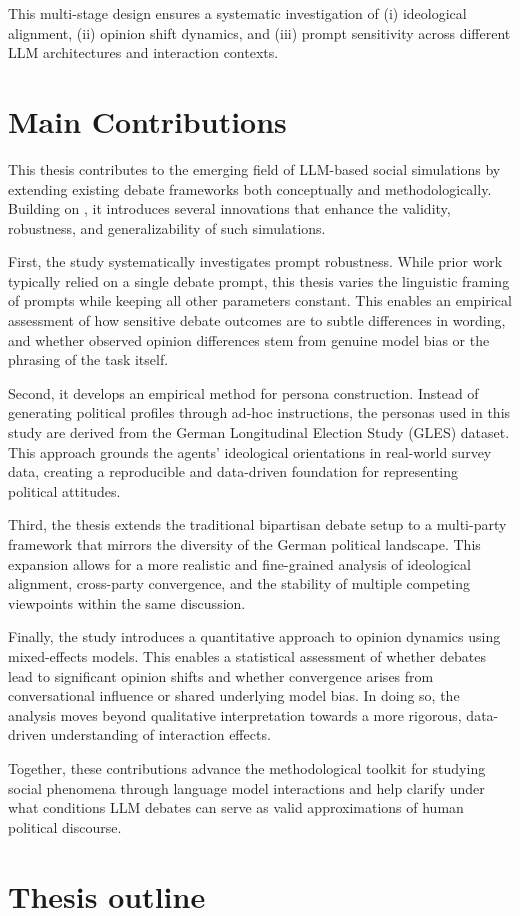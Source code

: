 This multi-stage design ensures a systematic investigation of (i) ideological alignment, (ii) opinion shift dynamics, and (iii) prompt sensitivity across different LLM architectures and interaction contexts.



\section{Main Contributions}

This thesis contributes to the emerging field of LLM-based social simulations by extending existing debate frameworks both conceptually and methodologically. Building on \citet{taubenfeld_systematic_2024}, it introduces several innovations that enhance the validity, robustness, and generalizability of such simulations.

First, the study systematically investigates prompt robustness. While prior work typically relied on a single debate prompt, this thesis varies the linguistic framing of prompts while keeping all other parameters constant. This enables an empirical assessment of how sensitive debate outcomes are to subtle differences in wording, and whether observed opinion differences stem from genuine model bias or the phrasing of the task itself.

Second, it develops an empirical method for persona construction. Instead of generating political profiles through ad-hoc instructions, the personas used in this study are derived from the German Longitudinal Election Study (GLES) dataset. This approach grounds the agents’ ideological orientations in real-world survey data, creating a reproducible and data-driven foundation for representing political attitudes.

Third, the thesis extends the traditional bipartisan debate setup to a multi-party framework that mirrors the diversity of the German political landscape. This expansion allows for a more realistic and fine-grained analysis of ideological alignment, cross-party convergence, and the stability of multiple competing viewpoints within the same discussion.

Finally, the study introduces a quantitative approach to opinion dynamics using mixed-effects models. This enables a statistical assessment of whether debates lead to significant opinion shifts and whether convergence arises from conversational influence or shared underlying model bias. In doing so, the analysis moves beyond qualitative interpretation towards a more rigorous, data-driven understanding of interaction effects.

Together, these contributions advance the methodological toolkit for studying social phenomena through language model interactions and help clarify under what conditions LLM debates can serve as valid approximations of human political discourse.



\section{Thesis outline}

